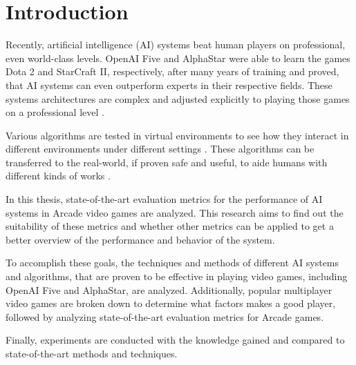  \chapter{Introduction}
Recently, artificial intelligence (AI) systems beat human players on professional, even world-class levels. OpenAI Five and AlphaStar were able to learn the games Dota 2 and StarCraft II, respectively, after many years of training and proved, that AI systems can even outperform experts in their respective fields. These systems architectures are complex and adjusted explicitly to playing those games on a professional level \cite{Vinyals2019, 2019arXiv191206680O}. 

Various algorithms are tested in virtual environments to see how they interact in different environments under different settings \cite{2018arXiv180300933H}. These algorithms can be transferred to the real-world, if proven safe and useful, to aide humans with different kinds of works \cite{openai2019solving, tobin2017domain}. 

In this thesis, state-of-the-art evaluation metrics for the performance of AI systems in Arcade video games are analyzed. This research aims to find out the suitability of these metrics and whether other metrics can be applied to get a better overview of the performance and behavior of the system.

To accomplish these goals, the techniques and methods of different AI systems and algorithms, that are proven to be effective in playing video games, including OpenAI Five and AlphaStar, are analyzed. Additionally, popular multiplayer video games are broken down to determine what factors makes a good player, followed by analyzing state-of-the-art evaluation metrics for Arcade games.

Finally, experiments are conducted with the knowledge gained and compared to state-of-the-art methods and techniques.